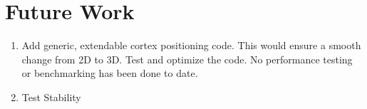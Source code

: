 \documentclass{article}
\begin{document}
\section{Future Work}
\begin{enumerate}
  \item Add generic, extendable cortex positioning code. This would ensure a
    smooth change from 2D to 3D. Test and optimize the code. No performance
    testing or benchmarking has been done to date. 
  \item Test Stability
\end{enumerate}
\end{document}
